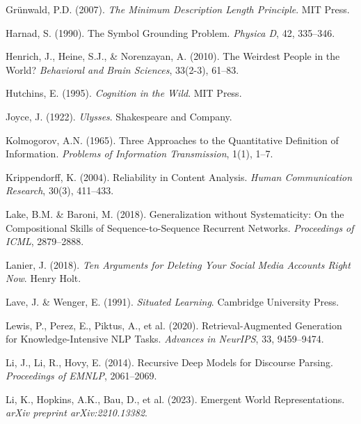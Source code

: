 \documentclass[12pt]{article}
\begin{document}
\begin{thebibliography}{99}
Grünwald, P.D. (2007). \textit{The Minimum Description Length Principle}. MIT Press.

Harnad, S. (1990). The Symbol Grounding Problem. \textit{Physica D}, 42, 335–346.

Henrich, J., Heine, S.J., \& Norenzayan, A. (2010). The Weirdest People in the World? \textit{Behavioral and Brain Sciences}, 33(2-3), 61–83.

Hutchins, E. (1995). \textit{Cognition in the Wild}. MIT Press.

Joyce, J. (1922). \textit{Ulysses}. Shakespeare and Company.

Kolmogorov, A.N. (1965). Three Approaches to the Quantitative Definition of Information. \textit{Problems of Information Transmission}, 1(1), 1–7.

Krippendorff, K. (2004). Reliability in Content Analysis. \textit{Human Communication Research}, 30(3), 411–433.

Lake, B.M. \& Baroni, M. (2018). Generalization without Systematicity: On the Compositional Skills of Sequence-to-Sequence Recurrent Networks. \textit{Proceedings of ICML}, 2879–2888.

Lanier, J. (2018). \textit{Ten Arguments for Deleting Your Social Media Accounts Right Now}. Henry Holt.

Lave, J. \& Wenger, E. (1991). \textit{Situated Learning}. Cambridge University Press.

Lewis, P., Perez, E., Piktus, A., et al. (2020). Retrieval-Augmented Generation for Knowledge-Intensive NLP Tasks. \textit{Advances in NeurIPS}, 33, 9459–9474.

Li, J., Li, R., Hovy, E. (2014). Recursive Deep Models for Discourse Parsing. \textit{Proceedings of EMNLP}, 2061–2069.

Li, K., Hopkins, A.K., Bau, D., et al. (2023). Emergent World Representations. \textit{arXiv preprint arXiv:2210.13382}.


\end{thebibliography}
\end{document}

